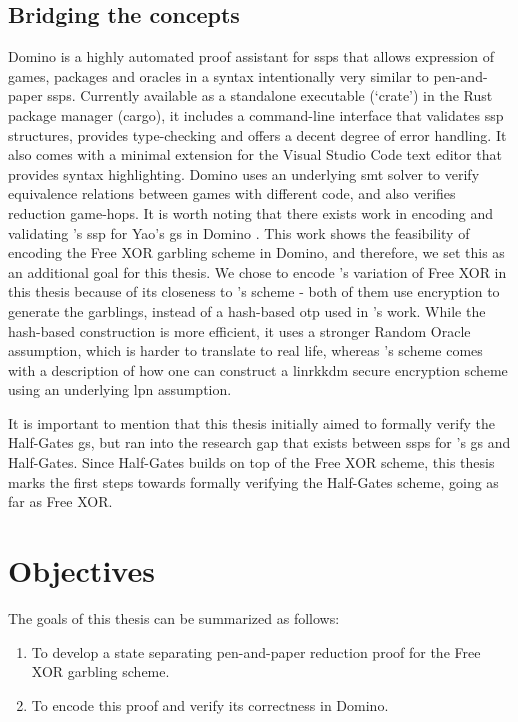 \subsection{Bridging the concepts}
Domino is a highly automated proof assistant for \acrshort{ssp}s that allows expression of games, packages and oracles in a syntax intentionally very similar to pen-and-paper \acrshort{ssp}s. Currently available as a standalone executable (`crate') in the Rust package manager (cargo), it includes a command-line interface that validates \acrshort{ssp} structures, provides type-checking and offers a decent degree of error handling. It also comes with a minimal extension for the Visual Studio Code text editor that provides syntax highlighting. Domino uses an underlying \acrfull{smt} solver to verify equivalence relations between games with different code, and also verifies reduction game-hops. It is worth noting that there exists work in encoding and validating \citeauthor{CSF:BrzOec23}'s \acrlong{ssp} for Yao's \acrlong{gs} in Domino \cite{domino:paper}. This work shows the feasibility of encoding the Free XOR garbling scheme in Domino, and therefore, we set this as an additional goal for this thesis. We chose to encode \citeauthor{JC:Applebaum16}'s variation of Free XOR in this thesis because of its closeness to \citeauthor{FOCS:Yao86}'s scheme - both of them use encryption to generate the garblings, instead of a hash-based \acrfull{otp} used in \citeauthor{ALP:KolSch08}'s work. While the hash-based construction is more efficient, it uses a stronger Random Oracle assumption, which is harder to translate to real life, whereas \citeauthor{JC:Applebaum16}'s scheme comes with a description of how one can construct a \acrlong{linrkkdm} secure encryption scheme using an underlying \acrfull{lpn} assumption.

It is important to mention that this thesis initially aimed to formally verify the Half-Gates \acrlong{gs}, but ran into the research gap that exists between \acrlong{ssp}s for \citeauthor{FOCS:Yao86}'s \acrlong{gs} and Half-Gates. Since Half-Gates builds on top of the Free XOR scheme, this thesis marks the first steps towards formally verifying the Half-Gates scheme, going as far as Free XOR.

\section{Objectives}
\label{sec:objectives}
The goals of this thesis can be summarized as follows:
\begin{enumerate}
    \item To develop a state separating pen-and-paper reduction proof for the Free XOR garbling scheme.
    \item To encode this proof and verify its correctness in Domino.
\end{enumerate}

